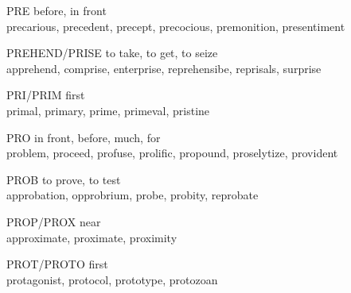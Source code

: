 \begin{flashcard}[Roots]{PRE}
before, in front\\
\vspace{0.2in}
precarious, precedent, precept, precocious, premonition, presentiment\\
\end{flashcard}

\begin{flashcard}[Roots]{PREHEND/PRISE}
to take, to get, to seize\\
\vspace{0.2in}
apprehend, comprise, enterprise, reprehensibe, reprisals, surprise\\
\end{flashcard}

\begin{flashcard}[Roots]{PRI/PRIM}
first\\
\vspace{0.2in}
primal, primary, prime, primeval, pristine\\
\end{flashcard}

\begin{flashcard}[Roots]{PRO}
in front, before, much, for\\
\vspace{0.2in}
problem, proceed, profuse, prolific, propound, proselytize, provident\\
\end{flashcard}

\begin{flashcard}[Roots]{PROB}
to prove, to test\\
\vspace{0.2in}
approbation, opprobrium, probe, probity, reprobate\\
\end{flashcard}

\begin{flashcard}[Roots]{PROP/PROX}
near\\
\vspace{0.2in}
approximate, proximate, proximity\\
\end{flashcard}

\begin{flashcard}[Roots]{PROT/PROTO}
first\\
\vspace{0.2in}
protagonist, protocol, prototype, protozoan\\
\end{flashcard}

